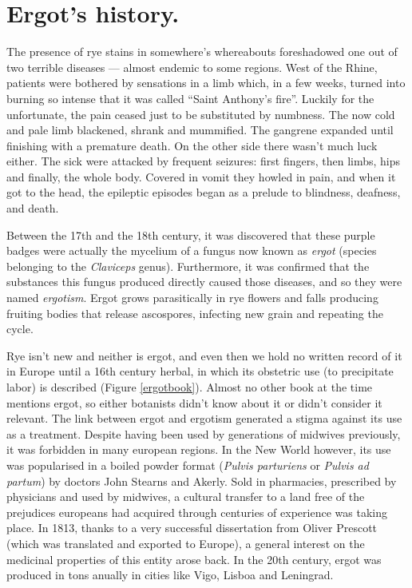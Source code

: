 \section{Ergot's history.}

The presence of rye stains in somewhere's whereabouts foreshadowed one out of two terrible diseases --- almost endemic to some regions. West of the Rhine, patients were bothered by sensations in a limb which, in a few weeks, turned into burning so intense that it was called \enquote{Saint Anthony's fire}. Luckily for the unfortunate, the pain ceased just to be substituted by numbness. The now cold and pale limb blackened, shrank and mummified. The gangrene expanded until finishing with a premature death. On the other side there wasn't much luck either. The sick were attacked by frequent seizures: first fingers, then limbs, hips and finally, the whole body. Covered in vomit they howled in pain, and when it got to the head, the epileptic episodes began as a prelude to blindness, deafness, and death.

Between the 17th and the 18th century, it was discovered that these purple badges were actually the mycelium of a fungus now known as \textit{ergot} (species belonging to the \textit{Claviceps} genus). Furthermore, it was confirmed that the substances this fungus produced directly caused those diseases, and so they were named \textit{ergotism}. Ergot grows parasitically in rye flowers and falls producing fruiting bodies that release ascospores, infecting new grain and repeating the cycle.

Rye isn't new and neither is ergot, and even then we hold no written record of it in Europe until a 16th century herbal, in which its obstetric use (to precipitate labor) is described (Figure \ref{ergotbook}). Almost no other book at the time mentions ergot, so either botanists didn't know about it or didn't consider it relevant. The link between ergot and ergotism generated a stigma against its use as a treatment. Despite having been used by generations of midwives previously, it was forbidden in many european regions. In the New World however, its use was popularised in a boiled powder format (\textit{Pulvis parturiens} or \textit{Pulvis ad partum}) by doctors John Stearns and Akerly. Sold in pharmacies, prescribed by physicians and used by midwives, a cultural transfer to a land free of the prejudices europeans had acquired through centuries of experience was taking place. In 1813, thanks to a very successful dissertation from Oliver Prescott (which was translated and exported to Europe), a general interest on the medicinal properties of this entity arose back. In the 20th century, ergot was produced in tons anually in cities like Vigo, Lisboa and Leningrad. 

